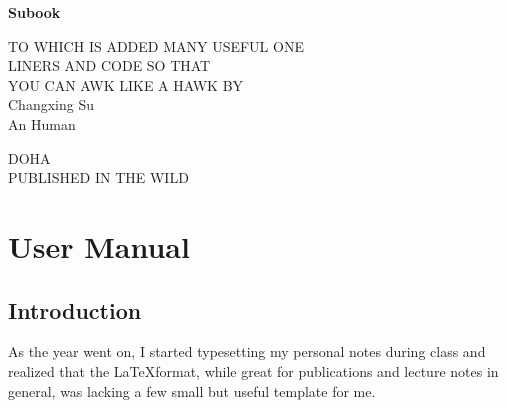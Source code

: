 \documentclass[]{subook}
\begin{document}
\pagestyle{empty}
\setcounter{page}{0}



\begin{center}
\bfseries
\nbvspace[1]
\Huge
{\nbtitlestretch\huge
Subook}

\nbvspace[1]
\normalsize

TO WHICH IS ADDED MANY USEFUL ONE\\
LINERS AND CODE SO THAT\\
YOU CAN AWK LIKE A HAWK
\nbvspace[1]
\small BY\\
\Large Changxing Su\\[0.5em]
\footnotesize An Human 

\nbvspace[2]

\nbvspace[3]
\normalsize

DOHA\\
\large
PUBLISHED IN THE WILD
\nbvspace[1]
\end{center}



\tableofcontents %


\restoregeometry

\pagestyle{fancy} %
\part{User Manual}

\chapter{Introduction}
\minitoc
As the year went on, I started typesetting my personal notes during class and realized that the \LaTeX  format, 
while great for publications and lecture notes in general, was lacking a few small but useful template for me.
\end{document}
